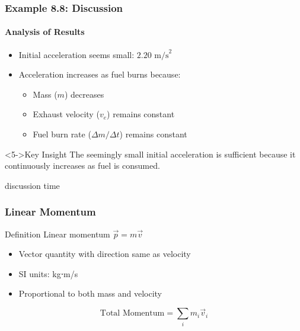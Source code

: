 \documentclass[aspectratio=169]{beamer}
\begin{document}
\begin{frame}
\frametitle{Example 8.8: Discussion}
\framesubtitle{Analysis of Results}

\begin{itemize}[<+->]
\item Initial acceleration seems small: $2.20 \text{ m/s}^2$
\item Acceleration increases as fuel burns because:
    \begin{itemize}
    \item Mass ($m$) decreases
    \item Exhaust velocity ($v_e$) remains constant
    \item Fuel burn rate ($\Delta m/\Delta t$) remains constant
    \end{itemize}

\end{itemize}

\begin{block}<5->{Key Insight}
The seemingly small initial acceleration is sufficient because it continuously increases as fuel is consumed.
\end{block}
\end{frame}

\begin{frame}{discussion time}
    
\end{frame}

\begin{frame}
\frametitle{Linear Momentum}
\begin{block}{Definition}
Linear momentum $\vec{p} = m\vec{v}$
\end{block}
\begin{itemize}
\item Vector quantity with direction same as velocity
\item SI units: kg⋅m/s
\item Proportional to both mass and velocity
\end{itemize}
\begin{equation*}
\text{Total Momentum} = \sum_i m_i\vec{v}_i
\end{equation*}
\end{frame}
\end{document}
